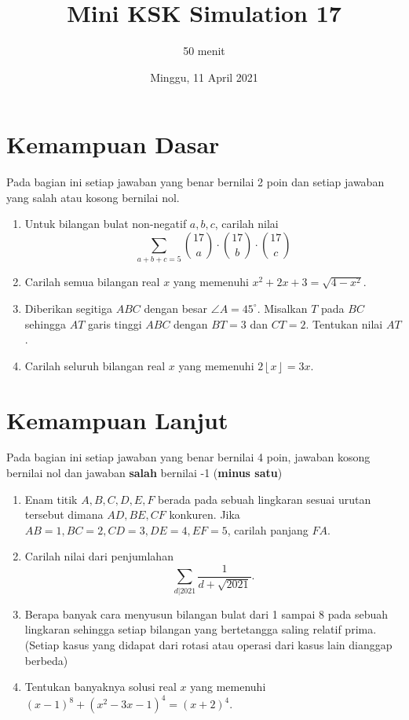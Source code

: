 \documentclass[12pt]{scrartcl}
\title{Mini KSK Simulation 17}
\author{50 menit}
\date{Minggu, 11 April 2021}
\begin{document}
	\maketitle

\renewcommand*\contentsname{Daftar Isi}
\tableofcontents

\newpage
	
	\section{Kemampuan Dasar}
	Pada bagian ini setiap jawaban yang benar bernilai 2 poin dan setiap jawaban yang salah
	atau kosong bernilai nol.
	\begin{enumerate}
		\item Untuk bilangan bulat non-negatif $a,b,c$, carilah nilai $$ \sum_{a+b+c=5} \binom {17} {a} \cdot \binom {17} {b} \cdot \binom {17} {c}$$
		
		\item Carilah semua bilangan real $x$ yang memenuhi $x^2+2x+3=\sqrt{4-x^2}$.
		
		\item Diberikan segitiga $ABC$ dengan besar $\angle A = 45^\circ$. Misalkan $T$ pada $BC$ sehingga $AT$ garis tinggi $ABC$ dengan $BT=3$ dan $CT=2$. Tentukan nilai $AT$.
		
		\item Carilah seluruh bilangan real $x$ yang memenuhi $2\left\lfloor x \right \rfloor = 3x$.
	\end{enumerate}

\section{Kemampuan Lanjut}
Pada bagian ini setiap jawaban yang benar bernilai 4 poin, jawaban kosong bernilai nol
dan jawaban \textbf{salah} bernilai -1 (\textbf{minus satu})

\begin{enumerate}[resume]
		\item Enam titik $A,B,C,D,E,F$ berada pada sebuah lingkaran sesuai urutan tersebut dimana $AD,BE,CF$ konkuren. Jika $AB=1, BC=2, CD= 3, DE=4, EF=5$, carilah panjang $FA$. 
		
		\item Carilah nilai dari penjumlahan $$\sum_{d|2021} \frac{1}{d+\sqrt{2021}}.$$
		
		\item Berapa banyak cara menyusun bilangan bulat dari 1 sampai 8 pada sebuah lingkaran sehingga setiap bilangan yang bertetangga saling relatif prima. (Setiap kasus yang didapat dari rotasi atau operasi dari kasus lain dianggap berbeda)
		
		\item Tentukan banyaknya solusi real $x$ yang memenuhi $(x-1)^8+(x^2-3x-1)^4=(x+2)^4.$
\end{enumerate}
\end{document}

